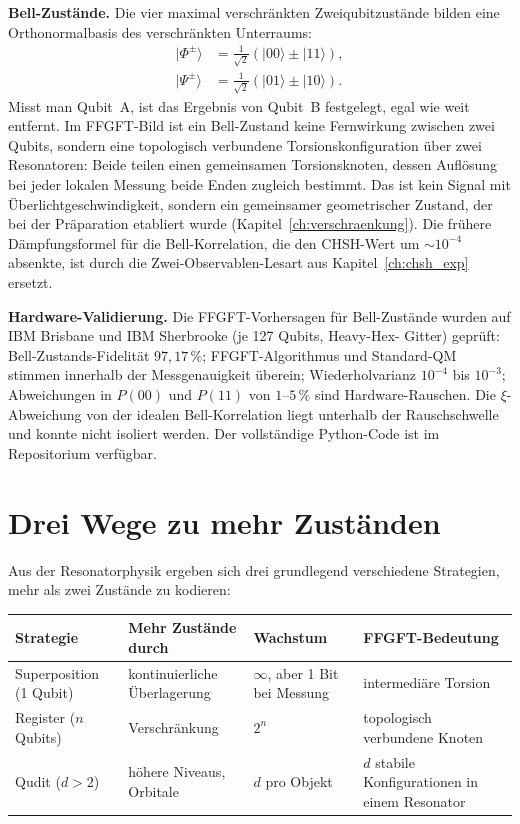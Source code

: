 \textbf{Bell-Zustände.} Die vier maximal verschränkten
Zweiqubitzustände bilden eine Orthonormalbasis des verschränkten
Unterraums:
\begin{align}
  |\Phi^\pm\rangle &= \tfrac{1}{\sqrt2}(|00\rangle\pm|11\rangle),\\
  |\Psi^\pm\rangle &= \tfrac{1}{\sqrt2}(|01\rangle\pm|10\rangle).
\end{align}
Misst man Qubit~A, ist das Ergebnis von Qubit~B festgelegt, egal wie
weit entfernt. Im FFGFT-Bild ist ein Bell-Zustand keine Fernwirkung
zwischen zwei Qubits, sondern eine topologisch verbundene
Torsionskonfiguration über zwei Resonatoren: Beide teilen einen
gemeinsamen Torsionsknoten, dessen Auflösung bei jeder lokalen Messung
beide Enden zugleich bestimmt. Das ist kein Signal mit
Überlichtgeschwindigkeit, sondern ein gemeinsamer geometrischer Zustand,
der bei der Präparation etabliert wurde (Kapitel~\ref{ch:verschraenkung}).
Die frühere Dämpfungsformel für die Bell-Korrelation, die den CHSH-Wert
um $\sim10^{-4}$ absenkte, ist durch die Zwei-Observablen-Lesart aus
Kapitel~\ref{ch:chsh_exp} ersetzt.

\textbf{Hardware-Validierung.} Die FFGFT-Vorhersagen für Bell-Zustände
wurden auf IBM Brisbane und IBM Sherbrooke (je 127 Qubits, Heavy-Hex-
Gitter) geprüft: Bell-Zustands-Fidelität $97{,}17\,\%$; FFGFT-Algorithmus
und Standard-QM stimmen innerhalb der Messgenauigkeit überein;
Wiederholvarianz $10^{-4}$ bis $10^{-3}$; Abweichungen in $P(00)$ und
$P(11)$ von $1$--$5\,\%$ sind Hardware-Rauschen. Die
$\xi$-Abweichung von der idealen Bell-Korrelation liegt unterhalb der
Rauschschwelle und konnte nicht isoliert werden. Der vollständige
Python-Code ist im Repositorium verfügbar.

\section{Drei Wege zu mehr Zuständen}

Aus der Resonatorphysik ergeben sich drei grundlegend verschiedene
Strategien, mehr als zwei Zustände zu kodieren:

\begin{center}
\small\renewcommand{\arraystretch}{1.3}
\begin{tabular}{p{1.6cm}p{2.3cm}p{1.6cm}p{2.5cm}}
\toprule
\textbf{Strategie} & \textbf{Mehr Zustände durch} & \textbf{Wachstum} & \textbf{FFGFT-Bedeutung} \\
\midrule
Superposition (1 Qubit) & kontinuierliche Überlagerung & $\infty$, aber 1 Bit bei Messung & intermediäre Torsion \\
Register ($n$ Qubits) & Verschränkung & $2^n$ & topologisch verbundene Knoten \\
Qudit ($d>2$) & höhere Niveaus, Orbitale & $d$ pro Objekt & $d$ stabile Konfigurationen in einem Resonator \\
\bottomrule
\end{tabular}
\end{center}

